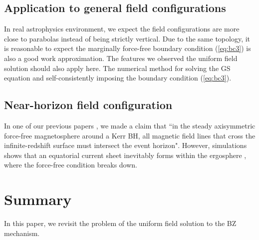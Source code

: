\documentclass[aps,prd,reprint,nofootinbib, superscriptaddress]{revtex4-1}
\begin{document}
\subsection{Application to general field configurations}
In real astrophysics environment, we expect the field configurations are more close to parabolas instead of
being strictly vertical. Due to the same topology, it is reasonable to expect
the marginally force-free boundary
condition (\ref{eq:bc3}) is also a good work approximation. The features we observed the uniform field solution
should also apply here. The numerical method for solving the GS equation and self-consistently imposing the boundary
condition (\ref{eq:bc3}).

\subsection{Near-horizon field configuration}
In one of our previous papers \cite{Pan2016a}, we made a claim that ``in the steady axisymmetric force-free magnetosphere
around a Kerr BH, all magnetic field lines that cross the infinite-redshift surface must intersect the event
horizon".
However, simulations shows that an equatorial current sheet inevitably forms within the ergosphere , where
the force-free condition breaks down.


\section{Summary}
\label{sec:summary}

In this paper, we revisit the problem of the uniform field solution to the BZ mechanism.


\end{document}
